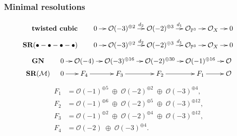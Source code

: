 \documentclass{beamer}
\begin{document}
\iffalse
\begin{frame}%
\frametitle{Minimal resolutions}

\begin{align*}
\textbf{twisted cubic}\qquad &
\xymatrix@C=1em{
0\ar[r]&\mathcal{O}(-3)^{\oplus 2}\ar[r]^{d_2}&
\mathcal{O}(-2)^{\oplus 3}\ar[r]^-{d_1}&
\mathcal{O}_{\mathbb{P}^3}\ar[r]&\mathcal{O}_X\ar[r]&0
}\\
\textbf{SR}(\bullet-\bullet-\bullet-\bullet)\qquad&
\xymatrix@C=1em{
0\ar[r]&\mathcal{O}(-3)^{\oplus 2}\ar[r]^{d_2}&
\mathcal{O}(-2)^{\oplus 3}\ar[r]^-{d_1}&
\mathcal{O}_{\mathbb{P}^3}\ar[r]&\mathcal{O}_X\ar[r]&0
}
\end{align*}
\vspace{-1em}
\pause\begin{align*}
\xymatrix@C=.9em@R=.2em{\textbf{GN}
&
0 \ar[r] &
\mathcal{O}(-4) \ar[r] &
\mathcal{O}(-3)^{\oplus 16} \ar[r] &
\mathcal{O}(-2)^{\oplus 30} \ar[r] &
\mathcal{O}(-1)^{\oplus 16} \ar[r] &
\mathcal{O}
\\
\textbf{SR}(\mathcal{M})&
0 \ar[r] &
F_4 \ar[r] &
F_3 \ar[r] &
F_2 \ar[r] &
F_1 \ar[r] &
\mathcal{O}
}
\end{align*}
\vspace{-1em}
\begin{align*}
F_1 &= \mathcal{O}(-1)^{\oplus 5}\;\oplus\;\mathcal{O}(-2)^{\oplus 2}\;\oplus\;\mathcal{O}(-3)^{\oplus 4},\\
F_2 &= \mathcal{O}(-1)^{\oplus 6}\;\oplus\;\mathcal{O}(-2)^{\oplus 5}\;\oplus\;\mathcal{O}(-3)^{\oplus 12},\\
F_3 &= \mathcal{O}(-1)^{\oplus 2}\;\oplus\;\mathcal{O}(-2)^{\oplus 4}\;\oplus\;\mathcal{O}(-3)^{\oplus 12},\\
F_4 &= \mathcal{O}(-2)\;\oplus\;\mathcal{O}(-3)^{\oplus 4}.
\end{align*}

\end{frame}
\end{document}
